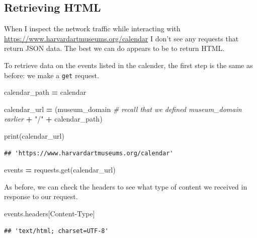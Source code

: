 \documentclass[
]{book}
\newenvironment{Shaded}{\begin{snugshade}}{\end{snugshade}}
\newcommand{\BuiltInTok}[1]{#1}
\newcommand{\CommentTok}[1]{\textcolor[rgb]{0.56,0.35,0.01}{\textit{#1}}}
\newcommand{\NormalTok}[1]{#1}
\newcommand{\OperatorTok}[1]{\textcolor[rgb]{0.81,0.36,0.00}{\textbf{#1}}}
\newcommand{\StringTok}[1]{\textcolor[rgb]{0.31,0.60,0.02}{#1}}
\begin{document}
\hypertarget{retrieving-html}{%
\subsection{Retrieving HTML}\label{retrieving-html}}

When I inspect the network traffic while interacting with \url{https://www.harvardartmuseums.org/calendar} I don't see any requests that return JSON data. The best we can do appears to be to return HTML.

To retrieve data on the events listed in the calender, the first step is the same as before: we make a \texttt{get} request.

\begin{Shaded}
\begin{Highlighting}[]
\NormalTok{calendar\_path }\OperatorTok{=} \StringTok{\textquotesingle{}calendar\textquotesingle{}}

\NormalTok{calendar\_url }\OperatorTok{=}\NormalTok{ (museum\_domain }\CommentTok{\# recall that we defined museum\_domain earlier}
                  \OperatorTok{+} \StringTok{"/"}
                  \OperatorTok{+}\NormalTok{ calendar\_path)}

\BuiltInTok{print}\NormalTok{(calendar\_url)}
\end{Highlighting}
\end{Shaded}

\begin{verbatim}
## 'https://www.harvardartmuseums.org/calendar'
\end{verbatim}

\begin{Shaded}
\begin{Highlighting}[]
\NormalTok{events }\OperatorTok{=}\NormalTok{ requests.get(calendar\_url)}
\end{Highlighting}
\end{Shaded}

As before, we can check the headers to see what type of content we received in response to our request.

\begin{Shaded}
\begin{Highlighting}[]
\NormalTok{events.headers[}\StringTok{\textquotesingle{}Content{-}Type\textquotesingle{}}\NormalTok{]}
\end{Highlighting}
\end{Shaded}

\begin{verbatim}
## 'text/html; charset=UTF-8'
\end{verbatim}
\end{document}
